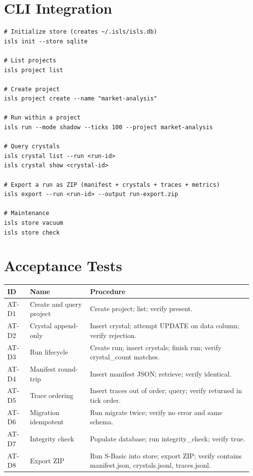 \documentclass[11pt,a4paper,twoside]{article}
\theoremstyle{definition}
\theoremstyle{plain}
\theoremstyle{remark}
\begin{document}
\section{CLI Integration}\label{sec:store:cli}

\begin{verbatim}
# Initialize store (creates ~/.isls/isls.db)
isls init --store sqlite

# List projects
isls project list

# Create project
isls project create --name "market-analysis"

# Run within a project
isls run --mode shadow --ticks 100 --project market-analysis

# Query crystals
isls crystal list --run <run-id>
isls crystal show <crystal-id>

# Export a run as ZIP (manifest + crystals + traces + metrics)
isls export --run <run-id> --output run-export.zip

# Maintenance
isls store vacuum
isls store check
\end{verbatim}


\section{Acceptance Tests}\label{sec:store:tests}

\begin{longtable}{l l p{7.5cm}}
\toprule
\textbf{ID} & \textbf{Name} & \textbf{Procedure} \\
\midrule
\endfirsthead
\midrule
\endhead
\bottomrule
\endfoot
AT-D1 & Create and query project & Create project; list; verify
  present. \\
AT-D2 & Crystal append-only & Insert crystal; attempt UPDATE on data
  column; verify rejection. \\
AT-D3 & Run lifecycle & Create run; insert crystals; finish run; verify
  crystal\_count matches. \\
AT-D4 & Manifest round-trip & Insert manifest JSON; retrieve; verify
  identical. \\
AT-D5 & Trace ordering & Insert traces out of order; query; verify
  returned in tick order. \\
AT-D6 & Migration idempotent & Run migrate twice; verify no error and
  same schema. \\
AT-D7 & Integrity check & Populate database; run integrity\_check;
  verify true. \\
AT-D8 & Export ZIP & Run S-Basic into store; export ZIP; verify
  contains manifest.json, crystals.jsonl, traces.jsonl. \\
\end{longtable}
\end{document}

